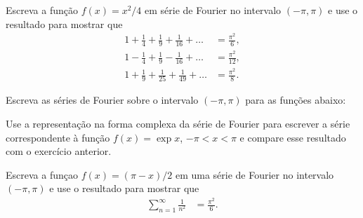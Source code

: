 \documentclass[a4paper,12pt, leqno, answers]{exam}
\begin{document}
\begin{questions}
    \question Escreva a fun\c{c}\~{a}o $f(x) = x^2 / 4$ em s\'{e}rie de Fourier no intervalo $(-\pi, \pi)$ e use o resultado para mostrar que 
    \begin{align*}
        1 + \frac{1}{4} + \frac{1}{9} + \frac{1}{16} + \ldots &= \frac{\pi^2}{6}, \\
        1 - \frac{1}{4} + \frac{1}{9} - \frac{1}{16} + \ldots &= \frac{\pi^2}{12}, \\
        1 + \frac{1}{9} + \frac{1}{25} + \frac{1}{49} + \ldots &= \frac{\pi^2}{8}.
    \end{align*}
    \begin{solution}
    \end{solution}

    \question Escreva as s\'{e}ries de Fourier sobre o intervalo $(-\pi, \pi)$ para as fun\c{c}\~{o}es abaixo:

    \question Use a representa\c{c}\~{a}o na forma complexa da s\'{e}rie de Fourier para escrever a s\'{e}rie correspondente \`{a} fun\c{c}\~{a}o $f(x) = \exp x$, $-\pi < x < \pi$ e compare esse resultado com o exerc\'{i}cio anterior.
    \begin{solution}
    \end{solution}

    \question Escreva a fun\c{c}ao $f(x) = \left( \pi - x \right) / 2$ em uma s\'{e}rie de Fourier no intervalo $(-\pi, \pi)$ e use o resultado para mostrar que 
    \begin{align*}
        \sum_{n = 1}^\infty \frac{1}{n^2} &= \frac{\pi^2}{6}.
    \end{align*}
    \begin{solution}
    \end{solution}


\end{questions}
\end{document}
